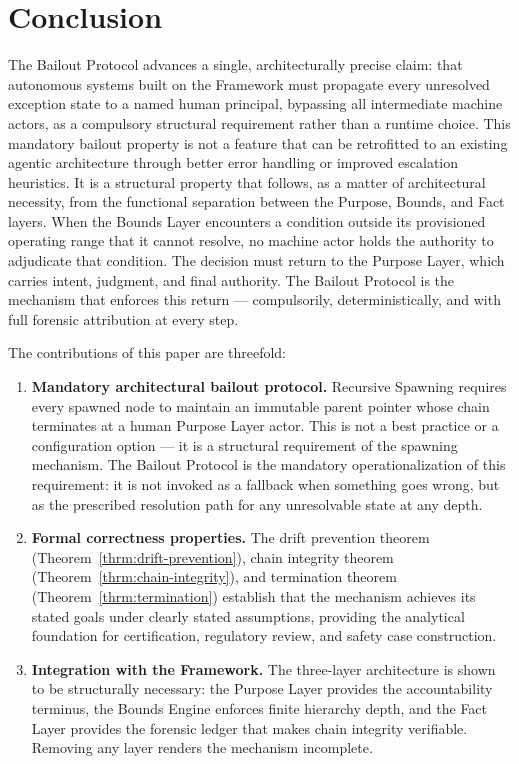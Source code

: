 \section{Conclusion}
\label{sec:conclusion}

The Bailout Protocol advances a single, architecturally precise claim: that autonomous systems built on the \bxthree{} Framework must propagate every unresolved exception state to a named human principal, bypassing all intermediate machine actors, as a compulsory structural requirement rather than a runtime choice. This mandatory bailout property is not a feature that can be retrofitted to an existing agentic architecture through better error handling or improved escalation heuristics. It is a structural property that follows, as a matter of architectural necessity, from the functional separation between the Purpose, Bounds, and Fact layers. When the Bounds Layer encounters a condition outside its provisioned operating range that it cannot resolve, no machine actor holds the authority to adjudicate that condition. The decision must return to the Purpose Layer, which carries intent, judgment, and final authority. The Bailout Protocol is the mechanism that enforces this return — compulsorily, deterministically, and with full forensic attribution at every step.

The contributions of this paper are threefold:

\begin{enumerate}
    \itemsep0em
    \item \textbf{Mandatory architectural bailout protocol.} Recursive Spawning requires every spawned node to maintain an immutable parent pointer whose chain terminates at a human Purpose Layer actor. This is not a best practice or a configuration option — it is a structural requirement of the spawning mechanism. The Bailout Protocol is the mandatory operationalization of this requirement: it is not invoked as a fallback when something goes wrong, but as the prescribed resolution path for any unresolvable state at any depth.
    \item \textbf{Formal correctness properties.} The drift prevention theorem (Theorem~\ref{thrm:drift-prevention}), chain integrity theorem (Theorem~\ref{thrm:chain-integrity}), and termination theorem (Theorem~\ref{thrm:termination}) establish that the mechanism achieves its stated goals under clearly stated assumptions, providing the analytical foundation for certification, regulatory review, and safety case construction.
    \item \textbf{Integration with the \bxthree{} Framework.} The three-layer architecture is shown to be structurally necessary: the Purpose Layer provides the accountability terminus, the Bounds Engine enforces finite hierarchy depth, and the Fact Layer provides the forensic ledger that makes chain integrity verifiable. Removing any layer renders the mechanism incomplete.
\end{enumerate}

